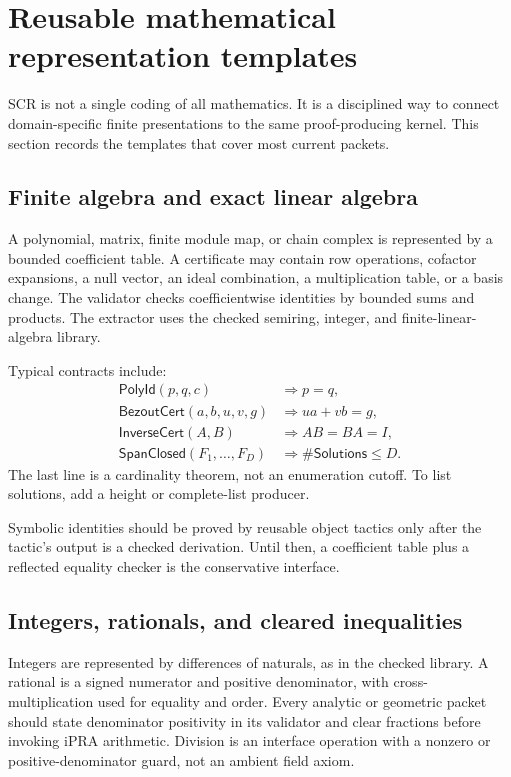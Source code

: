 \section{Reusable mathematical representation templates}
\label{sec:templates}

SCR is not a single coding of all mathematics.  It is a disciplined way to
connect domain-specific finite presentations to the same proof-producing
kernel.  This section records the templates that cover most current packets.

\subsection{Finite algebra and exact linear algebra}

A polynomial, matrix, finite module map, or chain complex is represented by a
bounded coefficient table.  A certificate may contain row operations,
cofactor expansions, a null vector, an ideal combination, a multiplication
table, or a basis change.  The validator checks coefficientwise identities by
bounded sums and products.  The extractor uses the checked semiring, integer,
and finite-linear-algebra library.

Typical contracts include:
\[
\begin{array}{ll}
\mathsf{PolyId}(p,q,c) &\Rightarrow p=q,\\
\mathsf{BezoutCert}(a,b,u,v,g) &\Rightarrow ua+vb=g,\\
\mathsf{InverseCert}(A,B) &\Rightarrow AB=BA=I,\\
\mathsf{SpanClosed}(F_1,\ldots,F_D) &\Rightarrow
        \#\mathsf{Solutions}\le D.
\end{array}
\]
The last line is a cardinality theorem, not an enumeration cutoff.  To list
solutions, add a height or complete-list producer.

Symbolic identities should be proved by reusable object tactics only after the
tactic's output is a checked derivation.  Until then, a coefficient table plus
a reflected equality checker is the conservative interface.

\subsection{Integers, rationals, and cleared inequalities}

Integers are represented by differences of naturals, as in the checked
library.  A rational is a signed numerator and positive denominator, with
cross-multiplication used for equality and order.  Every analytic or geometric
packet should state denominator positivity in its validator and clear
fractions before invoking iPRA arithmetic.  Division is an interface operation
with a nonzero or positive-denominator guard, not an ambient field axiom.

